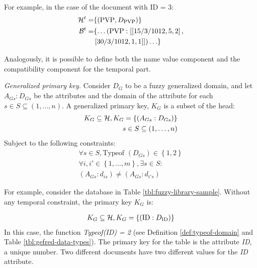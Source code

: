 For example, in the case of the document with ID = 3:
\begin{align}
\nonumber
\mathcal{H}^{t} = & \lbrace \left( \text{PVP}, D_{\text{PVP}}\right)\}\\
\nonumber
\mathcal{B}^ {t} =& \{ \ldots (\text{PVP}:[\left[15/3/1012,5,2\right],\\
\nonumber
& \left[30/3/1012,1,1\right]]) \ldots\} 
\end{align}


Analogously, it is possible to define both the name value component and the compatibility component for the temporal part.


\begin{definition}
\label{def:generalized-primary-key}
\emph{Generalized primary key.}
Consider $D_G$ to be a fuzzy generalized domain, and let $A_{Gs}:D_{Gs}$ be the attributes and the domain of the attribute for each $s \in S \subseteq \left(1, \ldots, n \right)$.
A generalized primary key, $K_G$ is a subset of the head:
\begin{align}
\label{eq:generalized-primary-key}
K_G \subseteq \mathcal{H}, K_G = \left \lbrace  \left(A_{Gs}:D_{Gs} \right) \right \rbrace \\
\nonumber
s\in S \subseteq \left(1, \ldots, n \right) \\
\end{align}
Subject to the following constraints:
\begin{align}
\forall s \in S, \text{Typeof } \left(D_{Gs} \right) \in \left \lbrace 1, 2 \right \rbrace \\
\nonumber
\forall i, i' \in \left \lbrace 1, \ldots, m\right \rbrace , \exists s \in S: \\
\nonumber
\left(A_{Gs}:d_{is} \right) \neq \left(A_{Gs}:d_{i's} \right)
\end{align}
\end{definition}

For example, consider the database in Table \ref{tbl:fuzzy-library-sample}. Without any temporal constraint, the primary key $K_G$ is:

\begin{align}
\nonumber
K_G \subseteq \mathcal{H}, K_G = \left \lbrace  \left(\text{ID}:D_{\text{ID}} \right) \right \rbrace
\end{align}
In this case, the function \emph{Typeof(ID) = 2} (see Definition \ref{def:typeof-domain} and Table \ref{tbl:gefred-data-types}). The primary key for the table is the attribute \emph{ID}, a unique number. Two different documents have two different values for the \emph{ID} attribute.

